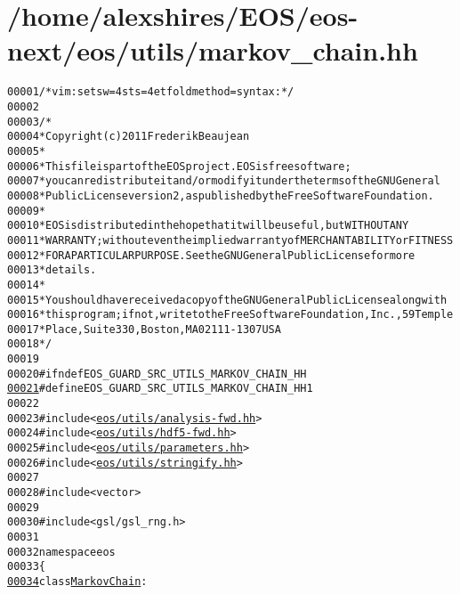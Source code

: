 \hypertarget{markov__chain_8hh_source}{
\section{/home/alexshires/EOS/eos-\/next/eos/utils/markov\_\-chain.hh}
}


\begin{footnotesize}\begin{alltt}
00001 \textcolor{comment}{/* vim: set sw=4 sts=4 et foldmethod=syntax : */}
00002 
00003 \textcolor{comment}{/*}
00004 \textcolor{comment}{ * Copyright (c) 2011 Frederik Beaujean}
00005 \textcolor{comment}{ *}
00006 \textcolor{comment}{ * This file is part of the EOS project. EOS is free software;}
00007 \textcolor{comment}{ * you can redistribute it and/or modify it under the terms of the GNU General}
00008 \textcolor{comment}{ * Public License version 2, as published by the Free Software Foundation.}
00009 \textcolor{comment}{ *}
00010 \textcolor{comment}{ * EOS is distributed in the hope that it will be useful, but WITHOUT ANY}
00011 \textcolor{comment}{ * WARRANTY; without even the implied warranty of MERCHANTABILITY or FITNESS}
00012 \textcolor{comment}{ * FOR A PARTICULAR PURPOSE.  See the GNU General Public License for more}
00013 \textcolor{comment}{ * details.}
00014 \textcolor{comment}{ *}
00015 \textcolor{comment}{ * You should have received a copy of the GNU General Public License along with}
00016 \textcolor{comment}{ * this program; if not, write to the Free Software Foundation, Inc., 59 Temple}
00017 \textcolor{comment}{ * Place, Suite 330, Boston, MA  02111-1307  USA}
00018 \textcolor{comment}{ */}
00019 
00020 \textcolor{preprocessor}{#ifndef EOS\_GUARD\_SRC\_UTILS\_MARKOV\_CHAIN\_HH}
\hypertarget{markov__chain_8hh_source_l00021}{}\hyperlink{markov__chain_8hh_ae0ec1ee591df5ff97e6f782528436afc}{00021} \textcolor{preprocessor}{}\textcolor{preprocessor}{#define EOS\_GUARD\_SRC\_UTILS\_MARKOV\_CHAIN\_HH 1}
00022 \textcolor{preprocessor}{}
00023 \textcolor{preprocessor}{#include <\hyperlink{analysis-fwd_8hh}{eos/utils/analysis-fwd.hh}>}
00024 \textcolor{preprocessor}{#include <\hyperlink{hdf5-fwd_8hh}{eos/utils/hdf5-fwd.hh}>}
00025 \textcolor{preprocessor}{#include <\hyperlink{parameters_8hh}{eos/utils/parameters.hh}>}
00026 \textcolor{preprocessor}{#include <\hyperlink{stringify_8hh}{eos/utils/stringify.hh}>}
00027 
00028 \textcolor{preprocessor}{#include <vector>}
00029 
00030 \textcolor{preprocessor}{#include <gsl/gsl\_rng.h>}
00031 
00032 \textcolor{keyword}{namespace }eos
00033 \{
\hypertarget{markov__chain_8hh_source_l00034}{}\hyperlink{classeos_1_1MarkovChain}{00034}     \textcolor{keyword}{class }\hyperlink{classeos_1_1MarkovChain}{MarkovChain} :

\end{alltt}
\end{footnotesize}

